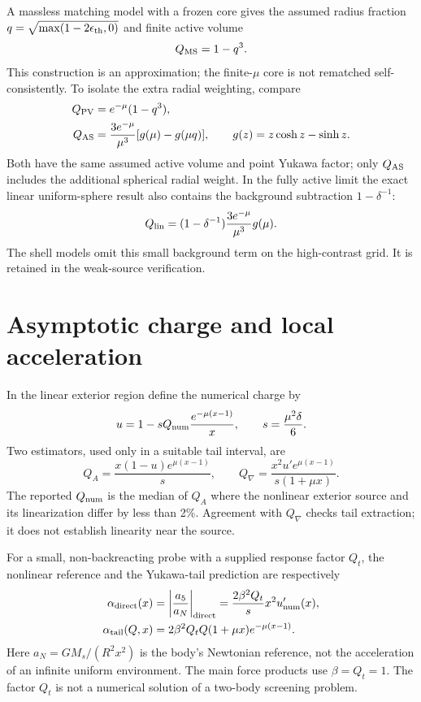 \documentclass[11pt,a4paper]{article}
\begin{document}
A massless matching model with a frozen core gives the assumed radius fraction
$q=\sqrt{\max(1-2\epsilon_{\mathrm{th}},0)}$ and finite active volume
\begin{equation}
 Q_{\mathrm{MS}}=1-q^3.
\end{equation}
This construction is an approximation; the finite-$\mu$ core is not rematched
self-consistently. To isolate the extra radial weighting, compare
\begin{align}
 Q_{\mathrm{PV}}&=e^{-\mu}(1-q^3),\\
 Q_{\mathrm{AS}}&=\frac{3e^{-\mu}}{\mu^3}[g(\mu)-g(\mu q)],
 \qquad g(z)=z\cosh z-\sinh z.
 \label{eq:ablation}
\end{align}
Both have the same assumed active volume and point Yukawa factor; only
$Q_{\mathrm{AS}}$ includes the additional spherical radial weight. In the fully active
limit the exact linear uniform-sphere result also contains the background
subtraction $1-\delta^{-1}$:
\begin{equation}
 Q_{\rm lin}=(1-\delta^{-1})\frac{3e^{-\mu}}{\mu^3}g(\mu).
\end{equation}
The shell models omit this small background term on the high-contrast grid.
It is retained in the weak-source verification.

\section{Asymptotic charge and local acceleration}
In the linear exterior region define the numerical charge by
\begin{equation}
 u=1-sQ_{\mathrm{num}}\frac{e^{-\mu(x-1)}}x,\qquad s=\frac{\mu^2\delta}{6}.
\end{equation}
Two estimators, used only in a suitable tail interval, are
\begin{equation}
 Q_A=\frac{x(1-u)e^{\mu(x-1)}}s,\qquad
 Q_\nabla=\frac{x^2u'e^{\mu(x-1)}}{s(1+\mu x)}.
\end{equation}
The reported $Q_{\mathrm{num}}$ is the median of $Q_A$ where the nonlinear exterior source
and its linearization differ by less than 2\%. Agreement with $Q_\nabla$
checks tail extraction; it does not establish linearity near the source.

For a small, non-backreacting probe with a supplied response factor $Q_t$, the
nonlinear reference and the Yukawa-tail prediction are respectively
\begin{align}
 \alpha_{\mathrm{direct}}(x)&=\left|\frac{a_5}{a_N}\right|_{\rm direct}
      =\frac{2\beta^2Q_t}{s}x^2u'_{\rm num}(x),\label{eq:direct}\\
 \alpha_{\mathrm{tail}}(Q,x)&=2\beta^2Q_tQ(1+\mu x)e^{-\mu(x-1)}.
 \label{eq:tail}
\end{align}
Here $a_N=GM_s/(R^2x^2)$ is the body's Newtonian reference, not the acceleration
of an infinite uniform environment. The main force products use $\beta=Q_t=1$.
The factor $Q_t$ is not a numerical solution of a two-body screening problem.
\end{document}
